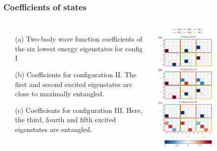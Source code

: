 \documentclass{beamer}
\begin{document}
\frame
    {
      \frametitle{Coefficients of states}
	
      \begin{footnotesize}
     \begin{columns}
       \column{5.0cm}
\begin{itemize}
\item[(a)] Two-body wave function coefficients of the six lowest energy eigenstates for config I

\item[(b)] Coefficients for configuration II. The first and second excited eigenstates are close to maximally entangled.

\item[(c)] Coefficients for configuration III. Here, the third, fourth and fifth excited eigenstates are entangled.

\end{itemize}

\column{6cm}
      \begin{center}
	\includegraphics[width=0.6\textwidth]{qcfigures/coeffs.pdf}
      \end{center}
\end{columns}
      \end{footnotesize}
    }
\end{document}
